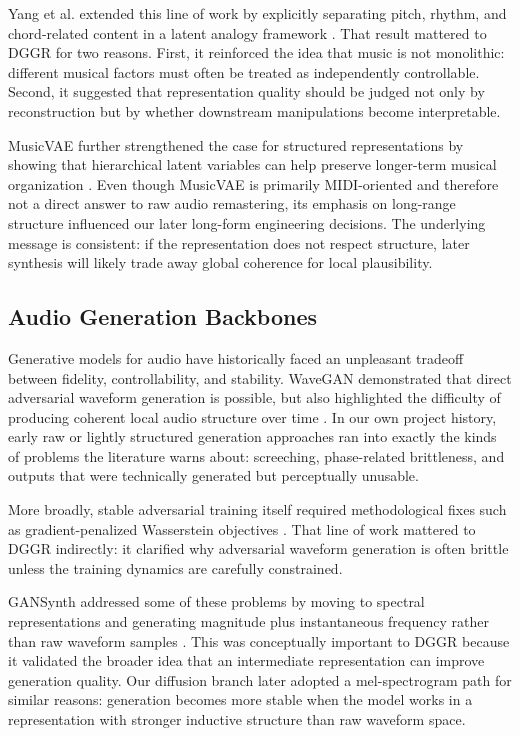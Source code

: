 \documentclass[conference]{IEEEtran}
\begin{document}
Yang et al. extended this line of work by explicitly separating pitch, rhythm, and chord-related content in a latent analogy framework \cite{yang2019}. That result mattered to DGGR for two reasons. First, it reinforced the idea that music is not monolithic: different musical factors must often be treated as independently controllable. Second, it suggested that representation quality should be judged not only by reconstruction but by whether downstream manipulations become interpretable.

MusicVAE further strengthened the case for structured representations by showing that hierarchical latent variables can help preserve longer-term musical organization \cite{musicvae2018}. Even though MusicVAE is primarily MIDI-oriented and therefore not a direct answer to raw audio remastering, its emphasis on long-range structure influenced our later long-form engineering decisions. The underlying message is consistent: if the representation does not respect structure, later synthesis will likely trade away global coherence for local plausibility.

\subsection{Audio Generation Backbones}
Generative models for audio have historically faced an unpleasant tradeoff between fidelity, controllability, and stability. WaveGAN demonstrated that direct adversarial waveform generation is possible, but also highlighted the difficulty of producing coherent local audio structure over time \cite{wavegan2018}. In our own project history, early raw or lightly structured generation approaches ran into exactly the kinds of problems the literature warns about: screeching, phase-related brittleness, and outputs that were technically generated but perceptually unusable.

More broadly, stable adversarial training itself required methodological fixes such as gradient-penalized Wasserstein objectives \cite{gulrajani2017}. That line of work mattered to DGGR indirectly: it clarified why adversarial waveform generation is often brittle unless the training dynamics are carefully constrained.

GANSynth addressed some of these problems by moving to spectral representations and generating magnitude plus instantaneous frequency rather than raw waveform samples \cite{gansynth2019}. This was conceptually important to DGGR because it validated the broader idea that an intermediate representation can improve generation quality. Our diffusion branch later adopted a mel-spectrogram path for similar reasons: generation becomes more stable when the model works in a representation with stronger inductive structure than raw waveform space.
\end{document}
